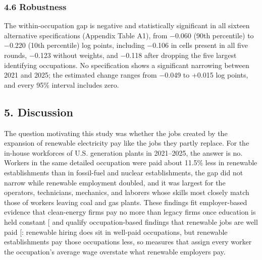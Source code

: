 \documentclass[
  11pt,
]{article}
\begin{document}
\subsubsection{4.6 Robustness}\label{robustness}

The within-occupation gap is negative and statistically significant in
all sixteen alternative specifications (Appendix Table A1), from −0.060
(90th percentile) to −0.220 (10th percentile) log points, including
−0.106 in cells present in all five rounds, −0.123 without weights, and
−0.118 after dropping the five largest identifying occupations. No
specification shows a significant narrowing between 2021 and 2025; the
estimated change ranges from −0.049 to +0.015 log points, and every 95\%
interval includes zero.

\subsection{5. Discussion}\label{discussion}

The question motivating this study was whether the jobs created by the
expansion of renewable electricity pay like the jobs they partly
replace. For the in-house workforces of U.S. generation plants in
2021--2025, the answer is no. Workers in the same detailed occupation
were paid about 11.5\% less in renewable establishments than in
fossil-fuel and nuclear establishments, the gap did not narrow while
renewable employment doubled, and it was largest for the operators,
technicians, mechanics, and laborers whose skills most closely match
those of workers leaving coal and gas plants. These findings fit
employer-based evidence that clean-energy firms pay no more than legacy
firms once education is held constant
{[}\citeproc{ref-colmer2025nice}{5}{]} and qualify occupation-based
findings that renewable jobs are well paid
{[}\citeproc{ref-curtis2023green}{4}{]}: renewable hiring does sit in
well-paid occupations, but renewable establishments pay those
occupations less, so measures that assign every worker the occupation's
average wage overstate what renewable employers pay.
\end{document}
